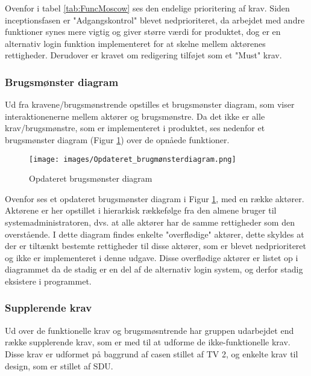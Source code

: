 Ovenfor i tabel \ref{tab:FuncMoscow} ses den endelige prioritering af krav. Siden inceptionsfasen er "Adgangskontrol" blevet nedprioriteret, da arbejdet med andre funktioner synes mere vigtig og giver større værdi for produktet, dog er en alternativ login funktion implementeret for at skelne mellem aktørenes rettigheder. Derudover er kravet om redigering tilføjet som et "Must" krav.

\subsubsection{Brugsmønster diagram}
Ud fra kravene/brugsmønstrende opstilles et brugsmønster diagram, som viser interaktionenerne mellem aktører og brugsmønstre. Da det ikke er alle krav/brugsmønstre, som er implementeret i produktet, ses nedenfor et brugsmønster diagram (Figur \ref{fig:brugsmønster}) over de opnåede funktioner. 

\begin{figure}[H]
    \centering
\texttt{[image: images/Opdateret\_brugmønsterdiagram.png]}
    \caption{Opdateret brugsmønster diagram}
    \label{fig:brugsmønster}
\end{figure}

Ovenfor ses et opdateret brugsmønster diagram i Figur \ref{fig:brugsmønster}, med en række aktører. Aktørene er her opstillet i hierarkisk rækkefølge fra den almene bruger til systemadministratoren, dvs. at alle aktører har de samme rettigheder som den overstående. I dette diagram findes enkelte "overflødige" aktører, dette skyldes at der er tiltænkt bestemte rettigheder til disse aktører, som er blevet nedprioriteret og ikke er implementeret i denne udgave. Disse overflødige aktører er listet op i diagrammet da de stadig er en del af de alternativ login system, og derfor stadig eksistere i programmet. \\

\subsubsection{Supplerende krav}
Ud over de funktionelle krav og brugsmøsntrende har gruppen udarbejdet end række supplerende krav, som er med til at udforme de ikke-funktionelle krav. Disse krav er udformet på baggrund af casen stillet af TV 2, og enkelte krav til design, som er stillet af SDU. 

